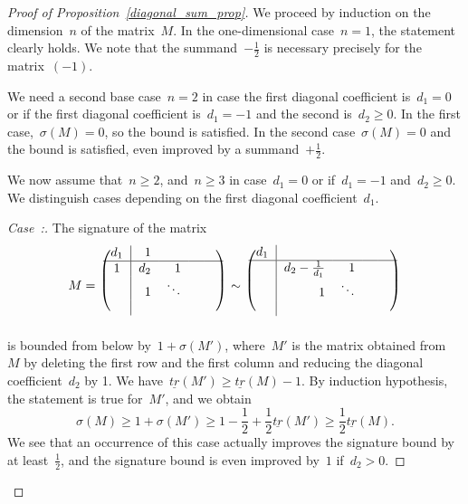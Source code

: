 \documentclass[AHL,Unicode,longabstracts,published]{cedram}
\newcounter{casecount}
\newenvironment{case}[1]{\refstepcounter{casecount}\begin{proof}[Case~\thecasecount:\;{#1}]}{\let\qed\relax\end{proof}}
\begin{document}
\begin{proof}[Proof of Proposition~\ref{diagonal_sum_prop}]
We proceed by induction on the dimension~$n$ of the matrix~$M$. In the one-dimensional case~$n=1$, the statement clearly holds. We note that the summand~$-\frac{1}{2}$ is necessary precisely for the matrix~$(-1)$.

We need a second base case~$n=2$ in case the first diagonal coefficient is~$d_1=0$ or if the first diagonal coefficient is~$d_1 =-1$ and the second is~$d_2\ge 0$. In the first case,~$\sigma(M) = 0$, so the bound is satisfied. In the second case~$\sigma(M)=0$ and the bound is satisfied, even improved by a summand~$+\frac{1}{2}$.

We now assume that~$n\ge2$, and~$n\ge3$ in case~$d_1 =0$ or if~$d_1= -1$ and~$d_2 \ge 0$. We distinguish cases depending on the first diagonal coefficient~$d_1$.
\begin{case}{{$d_1 \ge 1$}}%
The signature of the matrix
\begin{gather*}
M =\
\begin{blockarray}{crrrrc}
\begin{block}{(c|rrrrc)}
d_1 & 1 & \ & \ & \ \\ \BAhhline{-------------~} 1 & d_2 & 1 & \ & \ \\
\ & 1 & \ddots & & \\
\ & \ & & & \\
\end{block}
\end{blockarray}\
\sim\
\begin{blockarray}{crrrrc}
\begin{block}{(c|rrrrc)}
d_1 & & \ & \ & \ \\ \BAhhline{-------------~} & d_2-\frac{1}{d_1} & 1 & \ & \ \\
\ & 1 & \ddots & & \\
\ & \ & & & \\
\end{block}
\end{blockarray}\
\end{gather*}
is bounded from below by~$1+\sigma(M')$, where~$M'$ is the matrix obtained from~$M$ by deleting the first row and the first column and reducing the diagonal coefficient~$d_2$ by 1. We have~$\underline{tr}(M') \ge \underline{tr}(M) - 1$. By induction hypothesis, the statement is true for~$M'$, and we obtain
\[
\sigma(M) \ge 1 + \sigma(M') \ge 1 -\frac{1}{2}+ \frac{1}{2} \underline{tr}(M') \ge \frac{1}{2} \underline{tr}(M).
\]
We see that an occurrence of this case actually improves the signature bound by at least~$\frac{1}{2}$, and the signature bound is even improved by~$1$ if~$d_2 > 0$.
\end{case}


\end{proof}
\end{document}
